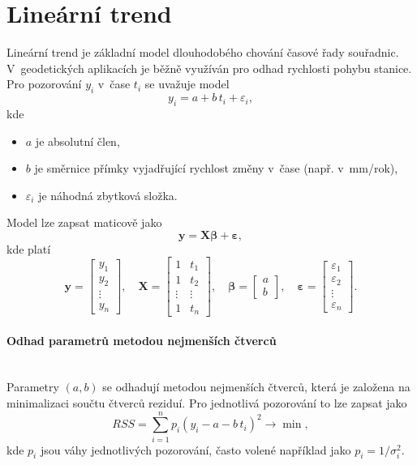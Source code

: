 \section{Lineární trend}

Lineární trend je základní model dlouhodobého chování časové řady souřadnic. V~geodetických aplikacích je běžně využíván pro odhad rychlosti pohybu stanice. Pro pozorování \(y_i\) v~čase \(t_i\) se uvažuje model
\begin{equation}
y_i = a + b\,t_i + \varepsilon_i,
\label{eq:lin_model}
\end{equation}
kde
\begin{itemize}
    \item \(a\) je absolutní člen,
    \item \(b\) je směrnice přímky vyjadřující rychlost změny v~čase (např. v~mm/rok),
    \item \(\varepsilon_i\) je náhodná zbytková složka.
\end{itemize}
Model lze zapsat maticově jako
\begin{equation}
\mathbf{y}=\mathbf{X}\boldsymbol{\beta}+\boldsymbol{\varepsilon},
\end{equation}
kde platí
\[
\mathbf{y}=\begin{bmatrix}y_1\\y_2\\\vdots\\y_n\end{bmatrix},\quad
\mathbf{X}=\begin{bmatrix}1&t_1\\1&t_2\\\vdots&\vdots\\1&t_n\end{bmatrix},\quad
\boldsymbol{\beta}=\begin{bmatrix}a\\b\end{bmatrix},\quad
\boldsymbol{\varepsilon}=\begin{bmatrix}\varepsilon_1\\\varepsilon_2\\\vdots\\\varepsilon_n\end{bmatrix}.
\]

\paragraph{Odhad parametrů metodou nejmenších čtverců}\leavevmode\\
Parametry \((a,b)\) se odhadují metodou nejmenších čtverců, která je založena na minimalizaci součtu čtverců reziduí. Pro jednotlivá pozorování to lze zapsat jako
\begin{equation}
RSS = \sum_{i=1}^{n} p_i \left(y_i - a - b\,t_i\right)^2 \rightarrow \min,
\label{eq:lsq_min}
\end{equation}
kde \(p_i\) jsou váhy jednotlivých pozorování, často volené například jako \(p_i = 1/\sigma_i^2\).

